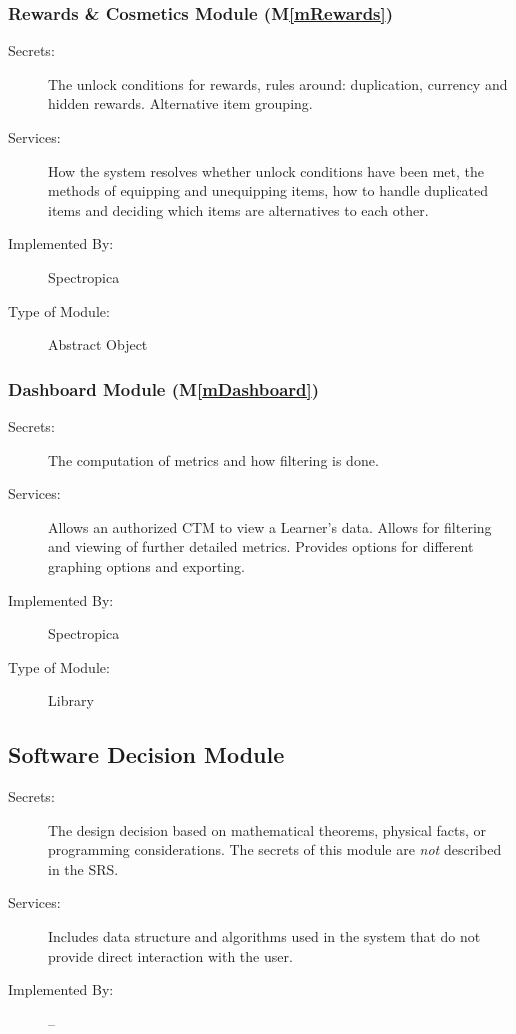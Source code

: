 \documentclass[12pt, titlepage]{article}
\newcommand{\mref}[1]{M\ref{#1}}
\begin{document}
\subsubsection{Rewards \& Cosmetics Module (\mref{mRewards})}

\begin{description}
\item[Secrets:] The unlock conditions for rewards, rules around: duplication, currency and hidden rewards. Alternative item grouping.
\item[Services:] How the system resolves whether unlock conditions have been met, the methods of equipping and unequipping items, how to handle duplicated items and deciding which items are alternatives to each other.
\item[Implemented By:] Spectropica
\item[Type of Module:] Abstract Object
\end{description}

\subsubsection{Dashboard Module (\mref{mDashboard})}

\begin{description}
\item[Secrets:] The computation of metrics and how filtering is done.
\item[Services:] Allows an authorized CTM to view a Learner's data. Allows for filtering and viewing of further detailed metrics. Provides options for different graphing options and exporting.
\item[Implemented By:] Spectropica
\item[Type of Module:] Library
\end{description}


\subsection{Software Decision Module}

\begin{description}
\item[Secrets:] The design decision based on mathematical theorems, physical
  facts, or programming considerations. The secrets of this module are
  \emph{not} described in the SRS.
\item[Services:] Includes data structure and algorithms used in the system that
  do not provide direct interaction with the user.
\item[Implemented By:] --
\end{description}
\end{document}

